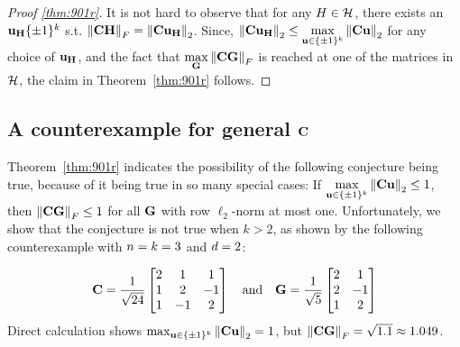 \begin{proof}[Proof \cref{thm:901r}]
It is not hard to observe that for any $H\in\mathcal{H}$, there exists an $\mathbf{u}_{\mathbf{H}}\{\pm 1\}^k$ s.t. $\left\|\mathbf{C}\mathbf{H}\right\|_F=\left\|\mathbf{C}\mathbf{u}_{\mathbf{H}}\right\|_2$. Since, $\left\|\mathbf{C}\mathbf{u}_{\mathbf{H}}\right\|_2\leq \max\limits_{\mathbf{u}\in\{\pm 1\}^k}\left\|\mathbf{C}\mathbf{u}\right\|_2$ for any choice of $\mathbf{u}_{\mathbf{H}}$, and the fact that $\max\limits_{\mathbf{G}}\left\|\mathbf{C}\mathbf{G}\right\|_F$ is reached at one of the matrices in $\mathcal{H}$, the claim in Theorem~\ref{thm:901r} follows.
\end{proof}

\subsection{A counterexample for general $\mathbf{C}$}
\label{sec:counterexample}

Theorem~\ref{thm:901r} indicates the possibility of the following conjecture being true, because of it being true in so many special cases: If $\max\limits_{\mathbf{u}\in\{\pm 1\}^k}\left\|\mathbf{C}\mathbf{u}\right\|_2\leq 1$, then $\left\|\mathbf{C}\mathbf{G}\right\|_F\leq 1$ for all $\mathbf{G}$ with row $\ell_2$-norm at most one. Unfortunately, we show that the conjecture is not true when $k>2$, as shown by the following counterexample with $n = k = 3$ and $d = 2$:%

\[
\mathbf{C} = \frac{1}{\sqrt{24}}\begin{bmatrix}
2 & 1 &  1 \\
1 & 2 & -1 \\
1 &-1 &  2 
\end{bmatrix}
\quad \text{and} \quad
\mathbf{G} = \frac{1}{\sqrt{5}}\begin{bmatrix}
2 &  1 \\
2 & -1 \\
1 &  2
\end{bmatrix}
\]
Direct calculation shows  $\max_{\mathbf{u}\in\{\pm 1\}^k} \left\|\mathbf{C}\mathbf{u}\right\|_2 = 1$, but $\left\|\mathbf{C}\mathbf{G}\right\|_F = \sqrt{1.1} \approx 1.049$.








